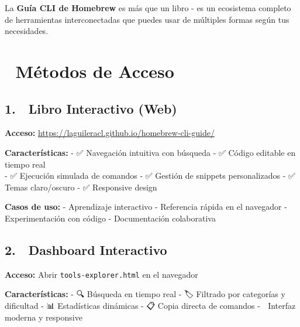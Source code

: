\documentclass[
  11pt,
  letterpaper,
  oneside,
  openany]{scrbook}
\begin{document}
\begin{tcolorbox}[enhanced jigsaw, toprule=.15mm, bottomrule=.15mm, opacityback=0, coltitle=black, rightrule=.15mm, colframe=quarto-callout-tip-color-frame, titlerule=0mm, opacitybacktitle=0.6, left=2mm, colback=white, bottomtitle=1mm, arc=.35mm, leftrule=.75mm, title=\textcolor{quarto-callout-tip-color}{\faLightbulb}\hspace{0.5em}{Un Ecosistema Completo y Conectado}, colbacktitle=quarto-callout-tip-color!10!white, breakable, toptitle=1mm]

La \textbf{Guía CLI de Homebrew} es más que un libro - es un ecosistema
completo de herramientas interconectadas que puedes usar de múltiples
formas según tus necesidades.

\end{tcolorbox}

\section{🎯 Métodos de Acceso}\label{muxe9todos-de-acceso}

\subsection{1. 📖 Libro Interactivo (Web)}\label{libro-interactivo-web}

\textbf{Acceso:} \url{https://laguileracl.github.io/homebrew-cli-guide/}

\textbf{Características:} - ✅ Navegación intuitiva con búsqueda - ✅
Código editable en tiempo real\\
- ✅ Ejecución simulada de comandos - ✅ Gestión de snippets
personalizados - ✅ Temas claro/oscuro - ✅ Responsive design

\textbf{Casos de uso:} - Aprendizaje interactivo - Referencia rápida en
el navegador - Experimentación con código - Documentación colaborativa

\subsection{2. 📱 Dashboard Interactivo}\label{dashboard-interactivo}

\textbf{Acceso:} Abrir \texttt{tools-explorer.html} en el navegador

\textbf{Características:} - 🔍 Búsqueda en tiempo real - 🏷️ Filtrado por
categorías y dificultad - 📊 Estadísticas dinámicas - 📋 Copia directa
de comandos - 🎨 Interfaz moderna y responsive
\end{document}
